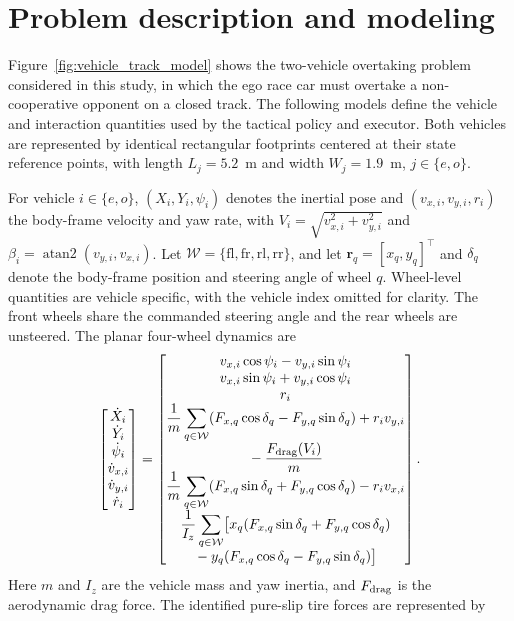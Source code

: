 \documentclass[sensors,article,submit,moreauthors]{Definitions/mdpi}
\begin{document}
\section{Problem description and modeling}
\label{sec:model}
Figure~\ref{fig:vehicle_track_model} shows the two-vehicle overtaking problem
considered in this study, in which the ego race car must overtake a
non-cooperative opponent on a closed track. The following
models define the vehicle and interaction quantities used by the tactical
policy and executor. Both vehicles are represented by identical rectangular
footprints centered at their state reference points, with length $L_j=5.2$~m
and width $W_j=1.9$~m,
$j\in\{e,o\}$.

For vehicle $i\in\{e,o\}$, $(X_i,Y_i,\psi_i)$ denotes the inertial
pose and $(v_{x,i},v_{y,i},r_i)$ the body-frame velocity and yaw rate, with
$V_i=\sqrt{v_{x,i}^2+v_{y,i}^2}$ and
$\beta_i=\operatorname{atan2}(v_{y,i},v_{x,i})$. Let
$\mathcal W=\{\mathrm{fl},\mathrm{fr},\mathrm{rl},\mathrm{rr}\}$, and let
$\bm r_q=[x_q,y_q]^\top$ and $\delta_q$ denote the body-frame position and
steering angle of wheel $q$. Wheel-level quantities are vehicle specific, with
the vehicle index omitted for clarity. The front wheels share the commanded
steering angle and the rear wheels are unsteered. The planar four-wheel
dynamics are
\begin{equation}
\begin{bmatrix}
\dot X_i\\
\dot Y_i\\
\dot\psi_i\\
\dot v_{x,i}\\
\dot v_{y,i}\\
\dot r_i
\end{bmatrix}
=
\begin{bmatrix}
v_{x,i}\cos\psi_i-v_{y,i}\sin\psi_i\\
v_{x,i}\sin\psi_i+v_{y,i}\cos\psi_i\\
r_i\\
\begin{gathered}
\displaystyle\frac{1}{m}\sum_{q\in\mathcal W}
(F_{x,q}\cos\delta_q-F_{y,q}\sin\delta_q)+r_iv_{y,i}\\[-1mm]
\displaystyle{}-\frac{F_{\rm drag}(V_i)}{m}
\end{gathered}\\[3mm]
\displaystyle\frac{1}{m}\sum_{q\in\mathcal W}
(F_{x,q}\sin\delta_q+F_{y,q}\cos\delta_q)-r_iv_{x,i}\\[3mm]
\begin{gathered}
\displaystyle\frac{1}{I_z}\sum_{q\in\mathcal W}
\bigl[x_q(F_{x,q}\sin\delta_q+F_{y,q}\cos\delta_q)\\[-1mm]
\displaystyle{}-y_q(F_{x,q}\cos\delta_q-F_{y,q}\sin\delta_q)\bigr]
\end{gathered}
\end{bmatrix}.
\label{eq:vehicle_dynamics}
\end{equation}
Here $m$ and $I_z$ are the vehicle mass and yaw inertia, and
$F_{\rm drag}$ is the aerodynamic drag force. The identified pure-slip tire
forces are represented by
\end{document}
